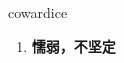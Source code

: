 
\begin{frame}
{\huge cowardice}
\begin{center}
\begin{enumerate}\Large
  \item \textbf{懦弱，不坚定}
\end{enumerate}
\end{center}
\end{frame}
